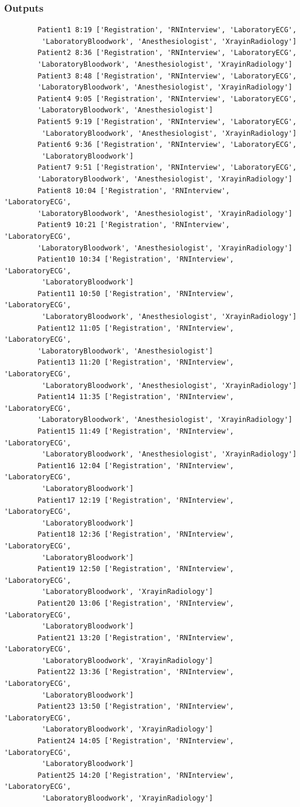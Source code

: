 \documentclass[12pt]{article}
\begin{document}
		\subsubsection{Outputs}
		\begin{verbatim}
		Patient1 8:19 ['Registration', 'RNInterview', 'LaboratoryECG',
		 'LaboratoryBloodwork', 'Anesthesiologist', 'XrayinRadiology']
		Patient2 8:36 ['Registration', 'RNInterview', 'LaboratoryECG', 
		'LaboratoryBloodwork', 'Anesthesiologist', 'XrayinRadiology']
		Patient3 8:48 ['Registration', 'RNInterview', 'LaboratoryECG', 
		'LaboratoryBloodwork', 'Anesthesiologist', 'XrayinRadiology']
		Patient4 9:05 ['Registration', 'RNInterview', 'LaboratoryECG', 
		'LaboratoryBloodwork', 'Anesthesiologist']
		Patient5 9:19 ['Registration', 'RNInterview', 'LaboratoryECG',
		 'LaboratoryBloodwork', 'Anesthesiologist', 'XrayinRadiology']
		Patient6 9:36 ['Registration', 'RNInterview', 'LaboratoryECG',
		 'LaboratoryBloodwork']
		Patient7 9:51 ['Registration', 'RNInterview', 'LaboratoryECG', 
		'LaboratoryBloodwork', 'Anesthesiologist', 'XrayinRadiology']
		Patient8 10:04 ['Registration', 'RNInterview', 'LaboratoryECG', 
		'LaboratoryBloodwork', 'Anesthesiologist', 'XrayinRadiology']
		Patient9 10:21 ['Registration', 'RNInterview', 'LaboratoryECG', 
		'LaboratoryBloodwork', 'Anesthesiologist', 'XrayinRadiology']
		Patient10 10:34 ['Registration', 'RNInterview', 'LaboratoryECG',
		 'LaboratoryBloodwork']
		Patient11 10:50 ['Registration', 'RNInterview', 'LaboratoryECG',
		 'LaboratoryBloodwork', 'Anesthesiologist', 'XrayinRadiology']
		Patient12 11:05 ['Registration', 'RNInterview', 'LaboratoryECG', 
		'LaboratoryBloodwork', 'Anesthesiologist']
		Patient13 11:20 ['Registration', 'RNInterview', 'LaboratoryECG',
		 'LaboratoryBloodwork', 'Anesthesiologist', 'XrayinRadiology']
		Patient14 11:35 ['Registration', 'RNInterview', 'LaboratoryECG', 
		'LaboratoryBloodwork', 'Anesthesiologist', 'XrayinRadiology']
		Patient15 11:49 ['Registration', 'RNInterview', 'LaboratoryECG',
		 'LaboratoryBloodwork', 'Anesthesiologist', 'XrayinRadiology']
		Patient16 12:04 ['Registration', 'RNInterview', 'LaboratoryECG',
		 'LaboratoryBloodwork']
		Patient17 12:19 ['Registration', 'RNInterview', 'LaboratoryECG',
		 'LaboratoryBloodwork']
		Patient18 12:36 ['Registration', 'RNInterview', 'LaboratoryECG',
		 'LaboratoryBloodwork']
		Patient19 12:50 ['Registration', 'RNInterview', 'LaboratoryECG',
		 'LaboratoryBloodwork', 'XrayinRadiology']
		Patient20 13:06 ['Registration', 'RNInterview', 'LaboratoryECG',
		 'LaboratoryBloodwork']
		Patient21 13:20 ['Registration', 'RNInterview', 'LaboratoryECG',
		 'LaboratoryBloodwork', 'XrayinRadiology']
		Patient22 13:36 ['Registration', 'RNInterview', 'LaboratoryECG',
		 'LaboratoryBloodwork']
		Patient23 13:50 ['Registration', 'RNInterview', 'LaboratoryECG',
		 'LaboratoryBloodwork', 'XrayinRadiology']
		Patient24 14:05 ['Registration', 'RNInterview', 'LaboratoryECG',
		 'LaboratoryBloodwork']
		Patient25 14:20 ['Registration', 'RNInterview', 'LaboratoryECG',
		 'LaboratoryBloodwork', 'XrayinRadiology']
		
		\end{verbatim}
		
\end{document}

